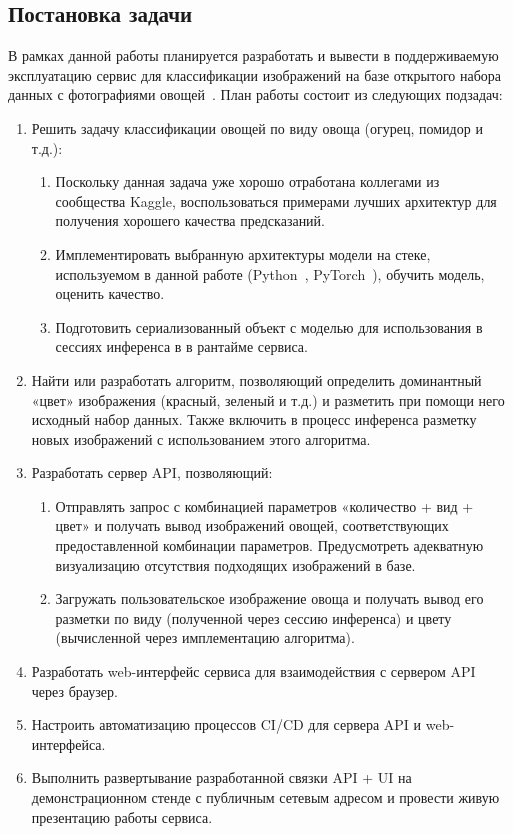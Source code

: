 \documentclass[a4paper,12pt]{extarticle}
\begin{document}
\subsection{Постановка задачи}

В рамках данной работы планируется разработать и вывести в поддерживаемую эксплуатацию сервис для
классификации изображений на базе открытого набора данных с фотографиями овощей~\cite{dataset}. План
работы состоит из следующих подзадач:

\begin{enumerate}
	\item Решить задачу классификации овощей по виду овоща (огурец, помидор и т.д.):
	\begin{enumerate}
		\item Поскольку данная задача уже хорошо отработана коллегами из сообщества Kaggle,
		воспользоваться примерами лучших архитектур для получения хорошего качества предсказаний.
		\item Имплементировать выбранную архитектуры модели на стеке, используемом в
		данной работе (Python~\cite{python}, PyTorch~\cite{pytorch}), обучить модель, оценить качество.
		\item Подготовить сериализованный объект с моделью для использования в сессиях инференса в
		в рантайме сервиса.
	\end{enumerate}
	\item Найти или разработать алгоритм, позволяющий определить доминантный «цвет» изображения
	(красный, зеленый и т.д.) и разметить при помощи него исходный набор данных. Также включить в
	процесс инференса разметку новых изображений с использованием этого алгоритма.
	\item Разработать сервер API, позволяющий:
	\begin{enumerate}
		\item Отправлять запрос с комбинацией параметров «количество + вид + цвет» и получать вывод
		изображений овощей, соответствующих предоставленной комбинации параметров. Предусмотреть
		адекватную визуализацию отсутствия подходящих изображений в базе.
		\item Загружать пользовательское изображение овоща и получать вывод его разметки по виду
		(полученной через сессию инференса) и цвету (вычисленной через имплементацию алгоритма).
	\end{enumerate}
	\item Разработать web-интерфейс сервиса для взаимодействия с сервером API через браузер.
	\item Настроить автоматизацию процессов CI/CD для сервера API и web-интерфейса.
	\item Выполнить развертывание разработанной связки API + UI на демонстрационном стенде с
	публичным сетевым адресом и провести живую презентацию работы сервиса.
\end{enumerate}
\end{document}
